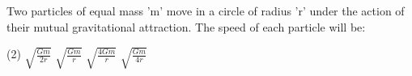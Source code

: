 \item Two particles of equal mass 'm' move in a circle of radius 'r' under the action of their mutual gravitational attraction. The speed of each particle will be:
\begin{tasks}(2)
    \task \(\sqrt{\frac{Gm}{2r}}\)
    \task \(\sqrt{\frac{Gm}{r}}\)
    \task \(\sqrt{\frac{4Gm}{r}}\)
    \task \(\sqrt{\frac{Gm}{4r}}\)
\end{tasks}